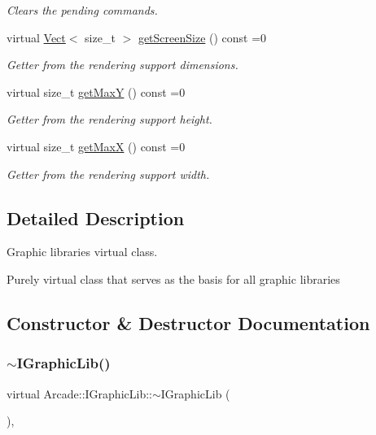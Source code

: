 \begin{DoxyCompactItemize}
\begin{DoxyCompactList}\small\item\em Clears the pending commands. \end{DoxyCompactList}\item 
virtual \hyperlink{class_arcade_1_1_vect}{Vect}$<$ size\+\_\+t $>$ \hyperlink{class_arcade_1_1_i_graphic_lib_a0ce5eb4661d55b6e729fc1c16566dd9f}{get\+Screen\+Size} () const =0
\begin{DoxyCompactList}\small\item\em Getter from the rendering support dimensions. \end{DoxyCompactList}\item 
virtual size\+\_\+t \hyperlink{class_arcade_1_1_i_graphic_lib_ae8701e702b51189c84b1900dd624912e}{get\+MaxY} () const =0
\begin{DoxyCompactList}\small\item\em Getter from the rendering support height. \end{DoxyCompactList}\item 
virtual size\+\_\+t \hyperlink{class_arcade_1_1_i_graphic_lib_a41a3c00970ecd16e1893105de2091a55}{get\+MaxX} () const =0
\begin{DoxyCompactList}\small\item\em Getter from the rendering support width. \end{DoxyCompactList}\end{DoxyCompactItemize}


\subsection{Detailed Description}
Graphic libraries virtual class. 

Purely virtual class that serves as the basis for all graphic libraries 

\subsection{Constructor \& Destructor Documentation}
\mbox{\label{class_arcade_1_1_i_graphic_lib_a57fc39424aebb606cc64ee8d7e40afd5}} 
\subsubsection{\texorpdfstring{$\sim$\+I\+Graphic\+Lib()}{~IGraphicLib()}}
{\footnotesize\ttfamily virtual Arcade\+::\+I\+Graphic\+Lib\+::$\sim$\+I\+Graphic\+Lib (\begin{DoxyParamCaption}{ }\end{DoxyParamCaption})\hspace{0.3cm}{\ttfamily [virtual]}, {\ttfamily [default]}}



